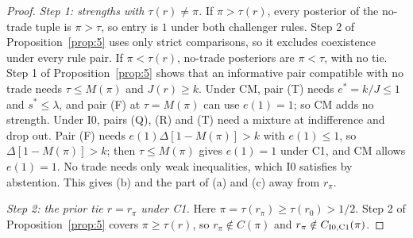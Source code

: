 \documentclass[11pt]{article}
\theoremstyle{definition}
\begin{document}
\begin{proof}
\emph{Step 1: strengths with $\tau(r)\ne\pi$.} If $\pi>\tau(r)$, every posterior of the no-trade tuple is
$\pi>\tau$, so entry is $1$ under both challenger rules. Step 2 of Proposition~\ref{prop:5} uses only strict
comparisons, so it excludes coexistence under every rule pair. If $\pi<\tau(r)$, no-trade posteriors are
$\pi<\tau$, with no tie. Step 1 of Proposition~\ref{prop:5} shows that an informative pair compatible with no trade
needs $\tau\le M(\pi)$ and $J(r)\ge k$. Under CM, pair (T) needs $e^*=k/J\le1$ and $s^*\le\lambda$, and pair (F) at
$\tau=M(\pi)$ can use $e(1)=1$; so CM adds no strength. Under I0, pairs (Q), (R) and (T) need a mixture at
indifference and drop out. Pair (F) needs $e(1)\Delta[1-M(\pi)]>k$ with $e(1)\le1$, so $\Delta[1-M(\pi)]>k$; then
$\tau\le M(\pi)$ gives $e(1)=1$ under C1, and CM allows $e(1)=1$. No trade needs only weak inequalities, which I0
satisfies by abstention. This gives (b) and the part of (a) and (c) away from $r_\pi$.

\emph{Step 2: the prior tie $r=r_\pi$ under C1.} Here $\pi=\tau(r_\pi)\ge\tau(r_0)>1/2$. Step 2 of
Proposition~\ref{prop:5} covers $\pi\ge\tau(r)$, so $r_\pi\notin C(\pi)$ and $r_\pi\notin C_{\rm I0,C1}(\pi)$.


\end{proof}
\end{document}
